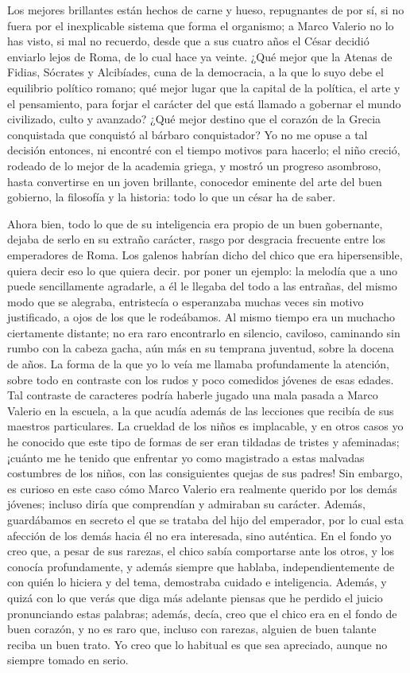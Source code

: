 \documentclass[11pt,openany]{book}
\begin{document}
Los mejores brillantes están hechos de carne y hueso, repugnantes de por sí, si no fuera por el inexplicable sistema que forma el organismo; a Marco Valerio no lo has visto, si mal no recuerdo, desde que a sus cuatro años el César decidió enviarlo lejos de Roma, de lo cual hace ya veinte. ¿Qué mejor que la Atenas de Fidias, Sócrates y Alcibíades, cuna de la democracia, a la que lo suyo debe el equilibrio político romano; qué mejor lugar que la capital de la política, el arte y el pensamiento, para forjar el carácter del que está llamado a gobernar el mundo civilizado, culto y avanzado? ¿Qué mejor destino que el corazón de la Grecia conquistada que conquistó al bárbaro conquistador? Yo no me opuse a tal decisión entonces, ni encontré con el tiempo motivos para hacerlo; el niño creció, rodeado de lo mejor de la academia griega, y mostró un progreso asombroso, hasta convertirse en un joven brillante, conocedor eminente del arte del buen gobierno, la filosofía y la historia: todo lo que un césar ha de saber. 

Ahora bien, todo lo que de su inteligencia era propio de un buen gobernante, dejaba de serlo en su extraño carácter, rasgo por desgracia frecuente entre los emperadores de Roma. Los galenos habrían dicho del chico que era hipersensible, quiera decir eso lo que quiera decir. por poner un ejemplo: la melodía que a uno puede sencillamente agradarle, a él le llegaba del todo a las entrañas, del mismo modo que se alegraba, entristecía o esperanzaba muchas veces sin motivo justificado, a ojos de los que le rodeábamos. Al mismo tiempo era un muchacho ciertamente distante; no era raro encontrarlo en silencio, caviloso, caminando sin rumbo con la cabeza gacha, aún más en su temprana juventud, sobre la docena de años. La forma de la que yo lo veía me llamaba profundamente la atención, sobre todo en contraste con los rudos y poco comedidos jóvenes de esas edades. Tal contraste de caracteres podría haberle jugado una mala pasada a Marco Valerio en la escuela, a la que acudía además de las lecciones que recibía de sus maestros particulares. La crueldad de los niños es implacable, y en otros casos yo he conocido que este tipo de formas de ser eran tildadas de tristes y afeminadas; ¡cuánto me he tenido que enfrentar yo como magistrado a estas malvadas costumbres de los niños, con las consiguientes quejas de sus padres! Sin embargo, es curioso en este caso cómo Marco Valerio era realmente querido por los demás jóvenes; incluso diría que comprendían y admiraban su carácter. Además, guardábamos en secreto el que se trataba del hijo del emperador, por lo cual esta afección de los demás hacia él no era interesada, sino auténtica. En el fondo yo creo que, a pesar de sus rarezas, el chico sabía comportarse ante los otros, y los conocía profundamente, y además siempre que hablaba, independientemente de con quién lo hiciera y del tema, demostraba cuidado e inteligencia. Además, y quizá con lo que verás que diga más adelante piensas que he perdido el juicio pronunciando estas palabras; además, decía, creo que el chico era en el fondo de buen corazón, y no es raro que, incluso con rarezas, alguien de buen talante reciba un buen trato. Yo creo que lo habitual es que sea apreciado, aunque no siempre tomado en serio. 
\end{document}
